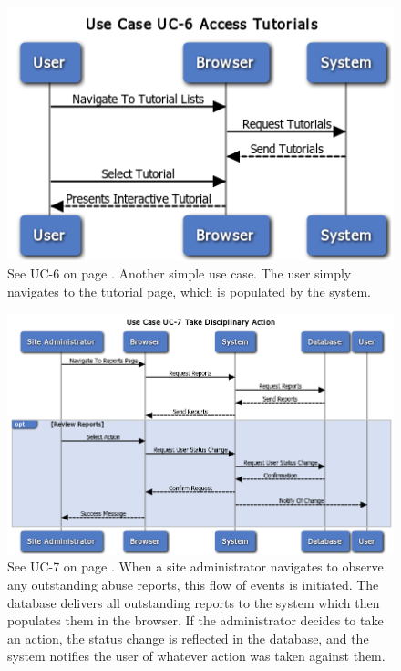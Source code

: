 \begin{figure}
\centering
\includegraphics[width=5.5in]{./Diagrams/SystemSequenceDiagrams/uc6.png}
\caption{See UC-6 on page \pageref{UC-6}. Another simple use case. The user simply navigates to the tutorial page, which is populated by the system.}
\end{figure}

\begin{figure}
\centering
\includegraphics[width=5.5in]{./Diagrams/SystemSequenceDiagrams/uc7.png}
\caption{See UC-7 on page \pageref{UC-7}. When a site administrator navigates to observe any outstanding abuse reports, this flow of events is initiated. The database delivers all outstanding reports to the system which then populates them in the browser. If the administrator decides to take an action, the status change is reflected in the database, and the system notifies the user of whatever action was taken against them.}
\end{figure}
